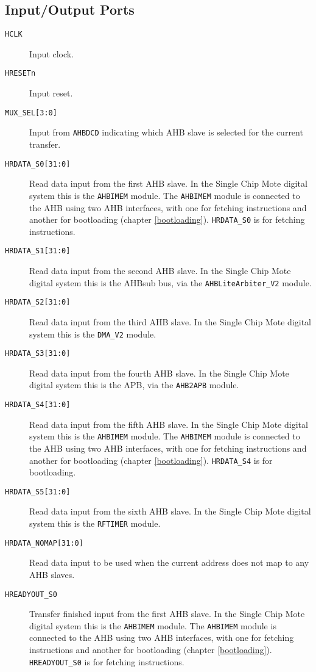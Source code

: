 \subsection{Input/Output Ports}
\begin{description}
	\item[\texttt{HCLK}] Input clock.
	\item[\texttt{HRESETn}] Input reset.
	\item[\texttt{MUX\_SEL[3:0]}] Input from \texttt{AHBDCD} indicating which AHB slave is selected for the current transfer.
	\item[\texttt{HRDATA\_S0[31:0]}] Read data input from the first AHB slave. In the Single Chip Mote digital system this is the \texttt{AHBIMEM} module. The \texttt{AHBIMEM} module is connected to the AHB using two AHB interfaces, with one for fetching instructions and another for bootloading (chapter \ref{bootloading}). \texttt{HRDATA\_S0} is for fetching instructions.
	\item[\texttt{HRDATA\_S1[31:0]}] Read data input from the second AHB slave. In the Single Chip Mote digital system this is the AHBsub bus, via the \texttt{AHBLiteArbiter\_V2} module.
	\item[\texttt{HRDATA\_S2[31:0]}] Read data input from the third AHB slave. In the Single Chip Mote digital system this is the \texttt{DMA\_V2} module.
	\item[\texttt{HRDATA\_S3[31:0]}] Read data input from the fourth AHB slave. In the Single Chip Mote digital system this is the APB, via the \texttt{AHB2APB} module.
	\item[\texttt{HRDATA\_S4[31:0]}] Read data input from the fifth AHB slave. In the Single Chip Mote digital system this is the \texttt{AHBIMEM} module. The \texttt{AHBIMEM} module is connected to the AHB using two AHB interfaces, with one for fetching instructions and another for bootloading (chapter \ref{bootloading}). \texttt{HRDATA\_S4} is for bootloading.
	\item[\texttt{HRDATA\_S5[31:0]}] Read data input from the sixth AHB slave. In the Single Chip Mote digital system this is the \texttt{RFTIMER} module.
	\item[\texttt{HRDATA\_NOMAP[31:0]}] Read data input to be used when the current address does not map to any AHB slaves.
	\item[\texttt{HREADYOUT\_S0}] Transfer finished input from the first AHB slave. In the Single Chip Mote digital system this is the \texttt{AHBIMEM} module. The \texttt{AHBIMEM} module is connected to the AHB using two AHB interfaces, with one for fetching instructions and another for bootloading (chapter \ref{bootloading}). \texttt{HREADYOUT\_S0} is for fetching instructions.

\end{description}
